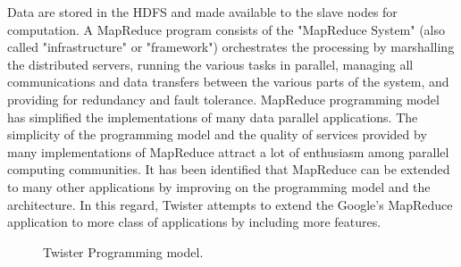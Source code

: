 \documentclass[9pt,twocolumn,twoside]{styles/osajnl}
\begin{document}
Data are stored in the HDFS and made available to the slave nodes for
computation. A MapReduce program consists of the "MapReduce System"
(also called "infrastructure" or "framework") orchestrates the
processing by marshalling the distributed servers, running the various
tasks in parallel, managing all communications and data transfers
between the various parts of the system, and providing for redundancy
and fault tolerance\cite{mohammed2014applications}. MapReduce
programming model has simplified the implementations of many data
parallel applications\cite{lee2012parallel}. The simplicity of the
programming model and the quality of services provided by many
implementations of MapReduce attract a lot of enthusiasm among
parallel computing
communities\cite{ekanayake2010twister}\cite{grolinger2014challenges}. It
has been identified that MapReduce can be extended to many other
applications by improving on the programming model and the
architecture. In this regard, Twister attempts to extend the Google’s
MapReduce application to more class of applications by including more
features\cite{twister}\cite{doulkeridis2014survey}.




\begin{figure}[htbp]
\centering
{}
\caption{Twister Programming model.}
\label{fig:Twister Programming model}
\end{figure}
\end{document}
